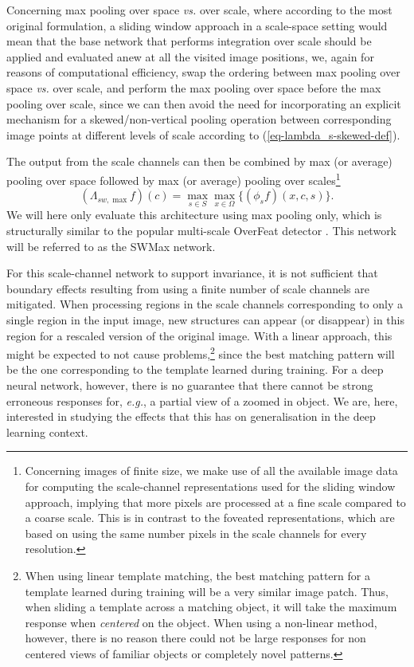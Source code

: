 \documentclass[twocolumn,runningheads]{svjour3}
\begin{document}
Concerning max pooling over space {\em vs.\/} over scale,
where according to the most original formulation, a sliding window
approach in a scale-space setting
would mean that the base network that performs integration
over scale should be applied and evaluated anew at all the visited
image positions, we, again for reasons of computational efficiency,
swap the ordering between max pooling
over space {\em vs.\/} over scale, and perform the max pooling over space before
the max pooling over scale, since we can then avoid the need for
incorporating an explicit mechanism for a
skewed/non-vertical pooling operation between corresponding image points
at different levels of scale according to (\ref{eq-lambda_s-skewed-def}).

The output from the scale channels can then be combined by max (or
average) pooling over space followed by max (or average) pooling over
scales\footnote{Concerning images of finite size, we make use of all the available image data
for computing the scale-channel representations used for the sliding
window approach, implying that more pixels are processed at a fine
scale compared to a coarse scale. This is in contrast to the
foveated representations, which are based on using the same number
pixels in the scale channels for every resolution.}
\begin{equation}
(\Lambda_{sw,\max} f)(c) = \max_{s \in S} \max_{x \in \Omega} \{ (\phi_s f)(x, c, s)  \}.
\label{eq-disc-sliding-window-pool}
\end{equation}
We will here only evaluate this architecture using max pooling only, which
is structurally similar to the popular multi-scale OverFeat detector
\cite{SerEigZhaMatFerLeC13-arXiv}. This network will be referred to as
the SWMax network. 

For this scale-channel network to support
invariance, it is not sufficient that boundary effects resulting from
using a finite number of scale channels are mitigated. When processing
regions in the scale channels corresponding to only a single region in
the input image, new structures can appear (or disappear) in this
region for a rescaled version of the original image. With a linear
approach, this might be expected to not cause problems,\footnote{When using linear template matching, the best matching
  pattern for a template learned during training will be a very
  similar image patch. Thus, when sliding a template across a matching
  object, it will take the maximum response when {\em centered\/} on
  the object. When using a non-linear method, however, there is no
  reason there could not be large responses for non centered views of
  familiar objects or completely novel patterns.}
since the best matching pattern will be the one corresponding to the template learned during training. 
For a deep neural network, however, there is no guarantee that there
cannot be strong erroneous responses for, {\em e.g.\/}, a partial view of a
zoomed in object. We are, here, interested in studying the effects
that this has on generalisation in the deep learning context. 
\end{document}
